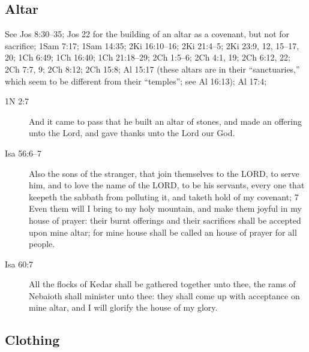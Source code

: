 	\subsection{Altar} %

		See Jos 8:30--35; Jos 22 for the building of an altar as a covenant, but not for sacrifice; 1Sam 7:17; 1Sam 14:35; 2Ki 16:10--16; 2Ki 21:4--5; 2Ki 23:9, 12, 15--17, 20; 1Ch 6:49; 1Ch 16:40; 1Ch 21:18--29; 2Ch 1:5--6; 2Ch 4:1, 19; 2Ch 6:12, 22; 2Ch 7:7, 9; 2Ch 8:12; 2Ch 15:8; Al 15:17 (these altars are in their ``sanctuaries,'' which seem to be different from their ``temples''; see Al 16:13); Al 17:4;
		
		\begin{description}
		\item[1N 2:7] And it came to pass that he built an altar of stones, and made an offering unto the Lord, and gave thanks unto the Lord our God.
		\item[Isa 56:6--7] Also the sons of the stranger, that join themselves to the LORD, to serve him, and to love the name of the LORD, to be his servants, every one that keepeth the sabbath from polluting it, and taketh hold of my covenant; 7 Even them will I bring to my holy mountain, and make them joyful in my house of prayer: their burnt offerings and their sacrifices shall be accepted upon mine altar; for mine house shall be called an house of prayer for all people.
		\item[Isa 60:7] All the flocks of Kedar shall be gathered together unto thee, the rams of Nebaioth shall minister unto thee: they shall come up with acceptance on mine altar, and I will glorify the house of my glory.
		\end{description}
		
	\subsection{Clothing} %
	
